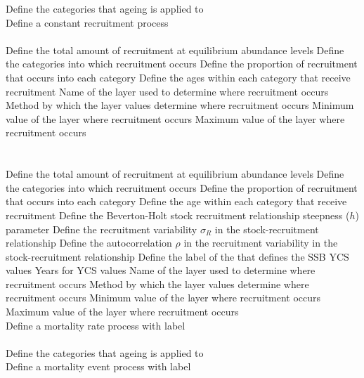  {Define the categories that ageing is applied to}
\\  {Define a constant recruitment process}\\ \\
 {Define the total amount of recruitment at equilibrium abundance levels}
 {Define the categories into which recruitment occurs}
 {Define the proportion of recruitment that occurs into each category}
 {Define the ages within each category that receive recruitment}
 {Name of the layer used to determine where recruitment occurs}
 {Method by which the layer values determine where recruitment occurs}
 {Minimum value of the layer where recruitment occurs}
 {Maximum value of the layer where recruitment occurs}
\\ \\ \\
 {Define the total amount of recruitment at equilibrium abundance levels}
 {Define the categories into which recruitment occurs}
 {Define the proportion of recruitment that occurs into each category}
 {Define the age within each category that receive recruitment}
 {Define the Beverton-Holt stock recruitment relationship steepness ($h$) parameter}
 {Define the recruitment variability $\sigma_R$ in the stock-recruitment relationship}
 {Define the autocorrelation $\rho$ in the recruitment variability in the stock-recruitment relationship}
 {Define the label of the  that defines the SSB}
 {YCS values}
 {Years for YCS values}
 {Name of the layer used to determine where recruitment occurs}
 {Method by which the layer values determine where recruitment occurs}
 {Minimum value of the layer where recruitment occurs}
 {Maximum value of the layer where recruitment occurs}
\\  {Define a mortality rate process with label}\\ \\
 {Define the categories that ageing is applied to}
\\  {Define a mortality event process with label}\\ \\
